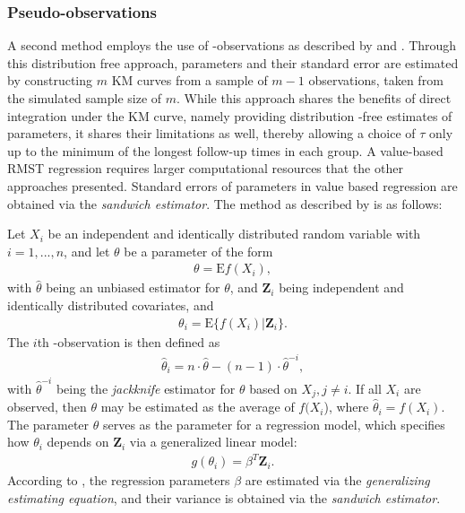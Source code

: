 \documentclass[main.tex]{subfiles}
\begin{document}
\subsubsection{Pseudo-observations}
A second method employs the use of -observations as described by \textcite{andersen2010} and \textcite{andersen2004regression}. Through this distribution free approach, parameters and their standard error are estimated by constructing $m$ KM curves from a sample of $m-1$ observations, taken from the simulated sample size of $m$. While this approach shares the benefits of direct integration under the KM curve, namely providing distribution -free estimates of parameters, it shares their limitations as well, thereby allowing a choice of $\tau$ only up to the minimum of the longest follow-up times in each group. A value-based RMST regression requires larger computational resources that the other approaches presented. Standard errors of parameters in value based regression are obtained via the \textit{sandwich estimator}. The method as described by \textcite{andersen2004regression} is as follows:

Let $X_i$ be an independent and identically distributed random variable with $i=1, ..., n$, and let $\theta$ be a parameter of the form
\begin{align}
\theta = \text{E}f(X_i),
\end{align}
with $\hat{\theta}$ being an unbiased estimator for $\theta$, and $\bm{Z}_i$ being independent and identically distributed covariates, and
\begin{align}
\theta_i = \text{E}\{f(X_i)|\bm{Z}_i\}.
\end{align}
The $i$th -observation is then defined as
\begin{align}
\hat{\theta}_i = n \cdot \hat{\theta} - (n-1) \cdot \hat{\theta}^{-i},
\end{align}
with $\hat{\theta}^{-i}$ being the \textit{jackknife} estimator for $\theta$ based on $X_j, j\neq i$. If all $X_i$ are observed, then $\theta$ may be estimated as the average of $f(X_i$), where $\hat{\theta}_i = f(X_i)$. The parameter $\theta$ serves as the parameter for a regression model, which specifies how $\theta_i$ depends on $\bm{Z}_i$ via a generalized linear model:
\begin{align}
g(\theta_i) = \beta^T\bm{Z}_i.
\end{align}
According to \textcite{andersen2003generalised}, the regression parameters $\beta$ are estimated via the \textit{generalizing estimating equation}, and their variance is obtained via the \textit{sandwich estimator}.
\end{document}
